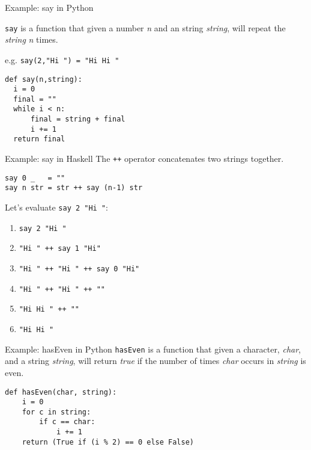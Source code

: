 \documentclass[pdf]{beamer}
\begin{document}
\begin{frame}[fragile]{Example: say in Python}

  \verb|say| is a function that given a number \textit{n} and an string \textit{string}, will repeat the \textit{string} \textit{n} times.

  e.g. \verb|say(2,"Hi ") = "Hi Hi "|

\begin{verbatim}
def say(n,string):
  i = 0
  final = ""
  while i < n:
      final = string + final
      i += 1
  return final
\end{verbatim}

\end{frame}

\begin{frame}[fragile]{Example: say in Haskell}
  The \verb|++| operator concatenates two strings together.

\begin{verbatim}
say 0 _   = ""
say n str = str ++ say (n-1) str
\end{verbatim}

  \pause
  Let's evaluate \verb|say 2 "Hi "|:

  \begin{enumerate}
    \item<1-> \verb|say 2 "Hi "|
    \item<2-> \verb|"Hi " ++ say 1 "Hi"|
    \item<3-> \verb|"Hi " ++ "Hi " ++ say 0 "Hi"|
    \item<4-> \verb|"Hi " ++ "Hi " ++ ""|
    \item<5-> \verb|"Hi Hi " ++ ""|
    \item<6-> \verb|"Hi Hi "|
  \end{enumerate}

\end{frame}

\begin{frame}[fragile]{Example: hasEven in Python}
  \verb|hasEven| is a function that given a character, \textit{char}, and a string \textit{string}, will return \textit{true} if the number of times \textit{char} occurs in \textit{string} is even.

\begin{verbatim}
def hasEven(char, string):
    i = 0
    for c in string:
        if c == char:
            i += 1
    return (True if (i % 2) == 0 else False)
\end{verbatim}

\end{frame}
\end{document}

